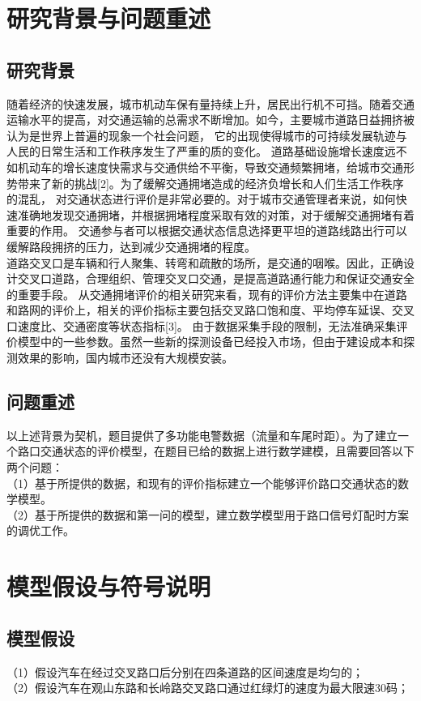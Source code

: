 \documentclass[UTF8]{article}
\begin{document}
    \section{研究背景与问题重述}
    \subsection{研究背景}
    随着经济的快速发展，城市机动车保有量持续上升，居民出行机不可挡。随着交通运输水平的提高，对交通运输的总需求不断增加。如今，主要城市道路日益拥挤被认为是世界上普遍的现象一个社会问题，
    它的出现使得城市的可持续发展轨迹与人民的日常生活和工作秩序发生了严重的质的变化。
    道路基础设施增长速度远不如机动车的增长速度快需求与交通供给不平衡，导致交通频繁拥堵，给城市交通形势带来了新的挑战[2]。为了缓解交通拥堵造成的经济负增长和人们生活工作秩序的混乱，
    对交通状态进行评价是非常必要的。对于城市交通管理者来说，如何快速准确地发现交通拥堵，并根据拥堵程度采取有效的对策，对于缓解交通拥堵有着重要的作用。
    交通参与者可以根据交通状态信息选择更平坦的道路线路出行可以缓解路段拥挤的压力，达到减少交通拥堵的程度。\\
    道路交叉口是车辆和行人聚集、转弯和疏散的场所，是交通的咽喉。因此，正确设计交叉口道路，合理组织、管理交叉口交通，是提高道路通行能力和保证交通安全的重要手段。
    从交通拥堵评价的相关研究来看，现有的评价方法主要集中在道路和路网的评价上，相关的评价指标主要包括交叉路口饱和度、平均停车延误、交叉口速度比、交通密度等状态指标[3]。
    由于数据采集手段的限制，无法准确采集评价模型中的一些参数。虽然一些新的探测设备已经投入市场，但由于建设成本和探测效果的影响，国内城市还没有大规模安装。\\
    \subsection{问题重述}
    以上述背景为契机，题目提供了多功能电警数据（流量和车尾时距）。为了建立一个路口交通状态的评价模型，在题目已给的数据上进行数学建模，且需要回答以下两个问题：\\
    （1）基于所提供的数据，和现有的评价指标建立一个能够评价路口交通状态的数学模型。\\
    （2）基于所提供的数据和第一问的模型，建立数学模型用于路口信号灯配时方案的调优工作。
    \section{模型假设与符号说明}
    \subsection{模型假设}
    （1）假设汽车在经过交叉路口后分别在四条道路的区间速度是均匀的；\\
    （2）假设汽车在观山东路和长岭路交叉路口通过红绿灯的速度为最大限速30码；\\
\end{document}
